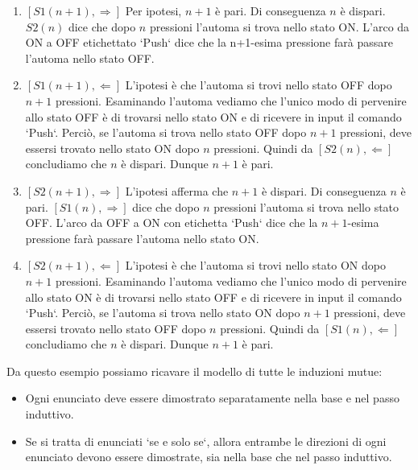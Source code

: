 		\begin{enumerate}
		  \item $[S1(n+1), \Rightarrow]$ Per ipotesi, $n+1$ \`e pari. Di conseguenza $n$ \`e
		  dispari.
		  $S2(n)$ dice che dopo $n$ pressioni l'automa si trova nello stato ON. L'arco
		  da ON a OFF etichettato `Push` dice che la n+1-esima pressione farà
		  passare l'automa nello stato OFF.
		  \item $[S1(n+1), \Leftarrow]$ L'ipotesi \`e che l'automa si trovi nello
		  stato OFF dopo $n+1$ pressioni. Esaminando l'automa vediamo che l'unico modo
		  di pervenire allo stato OFF \`e di trovarsi nello stato ON e di ricevere in
		  input il comando `Push`. Perci\`{o}, se l'automa si trova nello stato OFF dopo
		  $n+1$ pressioni, deve essersi trovato nello stato ON dopo $n$ pressioni.
		  Quindi da $[S2(n), \Leftarrow]$ concludiamo che $n$ \`{e} dispari. Dunque
		  $n+1$ \`e pari.
		  \item $[S2(n+1), \Rightarrow]$ L'ipotesi afferma che $n+1$ \`e dispari. Di conseguenza
		  $n$ \`e pari. $[S1(n), \Rightarrow]$ dice che dopo $n$ pressioni l'automa si trova
		  nello stato OFF. L'arco da OFF a ON con etichetta `Push` dice che la
		  $n+1$-esima pressione farà passare l'automa nello stato ON.
		  \item $[S2(n+1), \Leftarrow]$ L'ipotesi \`e che l'automa si trovi nello
		  stato ON dopo $n+1$ pressioni. Esaminando l'automa vediamo che l'unico modo
		  di pervenire allo stato ON \`e di trovarsi nello stato OFF e di ricevere in
		  input il comando `Push`. Perci\`{o}, se l'automa si trova nello stato ON dopo
		  $n+1$ pressioni, deve essersi trovato nello stato OFF dopo $n$ pressioni.
		  Quindi da $[S1(n), \Leftarrow]$ concludiamo che $n$ \`{e} dispari. Dunque
		  $n+1$ \`{e} pari.
		\end{enumerate}
		
		Da questo esempio possiamo ricavare il modello di tutte le induzioni mutue:
		
		\begin{itemize}
		  \item Ogni enunciato deve essere dimostrato separatamente nella base e nel
		  passo induttivo.
		  \item Se si tratta di enunciati `se e solo se`, allora entrambe le direzioni
		  di ogni enunciato devono essere dimostrate, sia nella base che nel passo
		  induttivo.
		\end{itemize}
		
		\newpage
		
